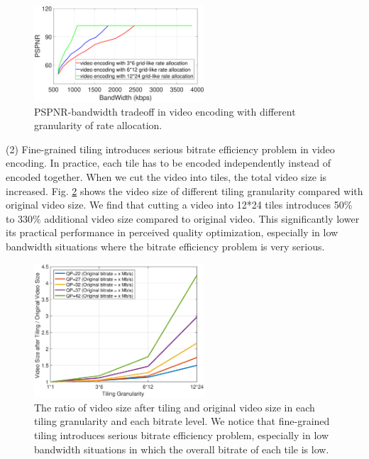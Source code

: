 \begin{figure}
  \centering
  \includegraphics[width=2.5in]{images/optimalencoding.eps}
  \caption{PSPNR-bandwidth tradeoff in video encoding with different granularity of rate allocation.}
  \label{optimalencoding}
  \end{figure}

(2) Fine-grained tiling introduces serious bitrate efficiency problem in video encoding. In practice, each tile has to be encoded independently instead of encoded together. When we cut the video into tiles, the total video size is increased. Fig. \ref{bitrateefficiency} shows the video size of different tiling granularity compared with original video size. We find that cutting a video into 12*24 tiles introduces 50\% to 330\% additional video size compared to original video. This significantly lower its practical performance in perceived quality optimization, especially in low bandwidth situations where the bitrate efficiency problem is very serious.

\begin{figure}
  \centering
  \includegraphics[width=2.5in]{images/bitrateefficiency.eps}
  \caption{The ratio of video size after tiling and original video size in each tiling granularity and each bitrate level. We notice that fine-grained tiling introduces serious bitrate efficiency problem, especially in low bandwidth situations in which the overall bitrate of each tile is low.}
  \label{bitrateefficiency}
  \end{figure}

